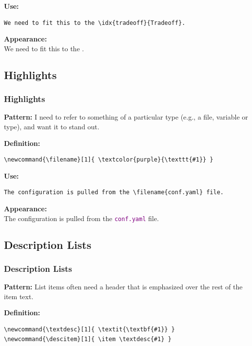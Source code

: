 {\begin{frame}[fragile]
  \vspace{5mm}
  \textbf{Use:}
  \begin{verbatim}
We need to fit this to the \idx{tradeoff}{Tradeoff}.
  \end{verbatim}
  
  \vspace{5mm}
  \textbf{Appearance:} \\
  We need to fit this to the .
\end{frame}

\subsection{Highlights}
\begin{frame}[fragile]
  \frametitle{Highlights}
  \vspace{3mm}
  \textbf{Pattern:} I need to refer to something of a particular type (e.g., a file, variable or type), and want it to stand out.
  
  \vspace{5mm}
  \textbf{Definition:}
  \begin{verbatim}
\newcommand{\filename}[1]{ \textcolor{purple}{\texttt{#1}} }
  \end{verbatim}
  
  \vspace{5mm}
  \textbf{Use:}
  \begin{verbatim}
The configuration is pulled from the \filename{conf.yaml} file.
  \end{verbatim}
  
  \vspace{5mm}
  \textbf{Appearance:}
  \\
  The configuration is pulled from the \textcolor{purple}{\texttt{conf.yaml}} file.
\end{frame}

\subsection{Description Lists}
\begin{frame}[fragile]
  \frametitle{Description Lists}
  \vspace{0mm}
  \textbf{Pattern:} List items often need a header that is emphasized over the rest of the item text.
  
  \vspace{3mm}
  \textbf{Definition:}
  \begin{verbatim}
\newcommand{\textdesc}[1]{ \textit{\textbf{#1}} }
\newcommand{\descitem}[1]{ \item \textdesc{#1} }
  \end{verbatim}
  

\end{frame}}
